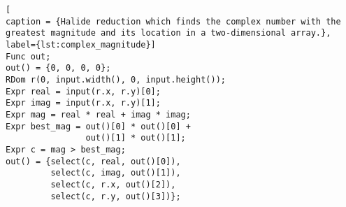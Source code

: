 \begin{lstlisting}[
caption = {Halide reduction which finds the complex number with the greatest magnitude and its location in a two-dimensional array.}, label={lst:complex_magnitude}]
Func out;
out() = {0, 0, 0, 0};
RDom r(0, input.width(), 0, input.height());
Expr real = input(r.x, r.y)[0];
Expr imag = input(r.x, r.y)[1];
Expr mag = real * real + imag * imag;
Expr best_mag = out()[0] * out()[0] +
                out()[1] * out()[1];
Expr c = mag > best_mag;
out() = {select(c, real, out()[0]),
         select(c, imag, out()[1]),
         select(c, r.x, out()[2]),
         select(c, r.y, out()[3])};
\end{lstlisting}
